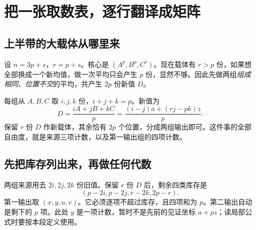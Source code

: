 \chapter{把一张取数表，逐行翻译成矩阵}\label{app:upper}
\section{上半带的大载体从哪里来}
设 $n=3p+s$，$r=p+s$。核心是 $(A^p,B^p,C^r)$。现在载体有 $r>p$ 份，如果想全部换成一个新均值，做一次平均只会产生 $p$ 份，显然不够。因此先做两组\emph{组成相同、位置不交}的平均，共产生 $2p$ 份新值 $D$。

每组从 $A,B,C$ 取 $i,j,k$ 份，$i+j+k=p$。新值为
\[D=\frac{iA+jB+kC}{p}
=\frac{(i-j)a+(rj-pk)z}{p}.
\]
保留 $r$ 份 $D$ 作新载体，其余恰有 $2p$ 个位置，分成两组输出即可。这件事的全部自由度，就是来源三项计数，以及第一输出组的四项计数。

\section{先把库存列出来，再做任何代数}
两组来源用去 $2i,2j,2k$ 份旧值。保留 $r$ 份 $D$ 后，剩余四类库存是
\[(p-2i, p-2j, r-2k, 2p-r).
\]
第一输出取 $(x,y,u,v)$。它必须逐项不超过库存，且四项和为 $p$。第二输出自动是剩下的 $p$ 项。此处 $y$ 是一项计数，暂时不是先前的见证坐标 $a+pz$；读局部公式时要按本段定义使用。

